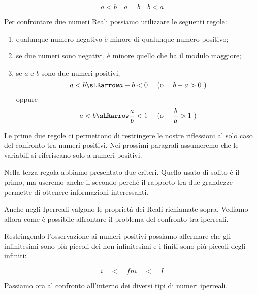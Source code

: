 \[a<b \quad a=b \quad b<a\]

Per confrontare due numeri Reali possiamo utilizzare le seguenti regole:

\begin{enumerate} [noitemsep]
 \item qualunque numero negativo è minore di qualunque numero positivo;
 \item se due numeri sono negativi, è minore quello che ha il modulo 
maggiore;
 \item se \(a\) e \(b\) sono due numeri positivi, 
 \[a<b \sLRarrow a-b<0 \quad \text{ (o } \quad b-a>0 \text{ )}\]
oppure
 \[a<b \sLRarrow \frac{a}{b}<1 \quad \text{ (o } \quad \frac{b}{a}>1 
   \text{ )}\]
\end{enumerate}

\begin{osservazione}
Le prime due regole ci permettono di restringere le nostre riflessioni al 
solo caso del confronto tra numeri positivi.
Nei prossimi paragrafi assumeremo che le variabili si riferiscano solo a 
numeri positivi.
\end{osservazione}

\begin{osservazione}
Nella terza regola abbiamo presentato due criteri. Quello usato di solito
è il primo, ma useremo anche il secondo perché il rapporto tra due 
grandezze permette di ottenere informazioni interessanti.
\end{osservazione}

\vspace{1em}

Anche negli Iperreali valgono le proprietà dei Reali richiamate sopra. 
Vediamo allora come è possibile affrontare il problema del confronto tra 
iperreali.

Restringendo l'osservazione ai numeri positivi possiamo affermare che gli 
infinitesimi sono più piccoli dei non infinitesimi e i finiti sono più 
piccoli degli infiniti:

\[i \quad < \quad fni \quad < \quad I\]

Passiamo ora al confronto all'interno dei diversi tipi di numeri iperreali.

